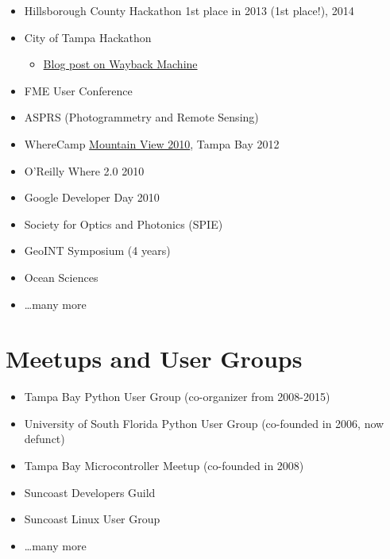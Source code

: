 \documentclass{article}
\newenvironment{mitemize}
               {%
                 \setlength{\parskip}{3pt}
                 \setlength{\itemsep}{2.5pt plus 1pt}
                 \begin{itemize}}
               {\end{itemize}}
\begin{document}
\begin{mitemize}
    \begin{mitemize}
    \item Tampa, Sarasota 2011, Orlando, Portland,  \ldots
    \end{mitemize}
  \item Hillsborough County Hackathon 1st place in 2013 (1st place!), 2014
  \item City of Tampa Hackathon
    \begin{mitemize}
    \item \href{https://web.archive.org/web/20120808120046/http://www.weogeo.com/blog/City_of_Tampa_Mayors_Hackathon.html}{Blog post on Wayback Machine}
    \end{mitemize}
  \item FME User Conference
  \item ASPRS (Photogrammetry and Remote Sensing)
  \item WhereCamp \href{https://conferences.oreilly.com/where/where2010/public/schedule/detail/14268}{Mountain View 2010}, Tampa Bay 2012
  \item O'Reilly Where 2.0 2010
  \item Google Developer Day 2010
  \item Society for Optics and Photonics (SPIE)
  \item GeoINT Symposium (4 years)
  \item Ocean Sciences
  \item \ldots many more
\end{mitemize}

\section*{Meetups and User Groups}
\begin{mitemize}
\item Tampa Bay Python User Group (co-organizer from 2008-2015)
\item University of South Florida Python User Group (co-founded in 2006, now defunct)
\item Tampa Bay Microcontroller Meetup (co-founded in 2008)
\item Suncoast Developers Guild
\item Suncoast Linux User Group
\item \ldots many more
\end{mitemize}
  
\end{document}
